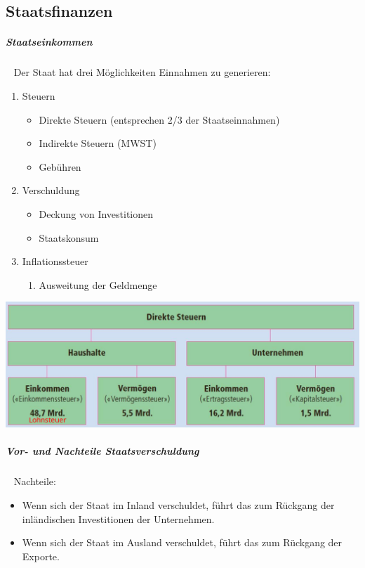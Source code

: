 \documentclass[11pt,twoside,landscape]{article}
\begin{document}
\begin{multicols}{3}
\section{Staatsfinanzen}
\label{sec:orgf94bfc7}
\subparagraph{Staatseinkommen} \
\label{sec:org14363e6}
Der Staat hat drei Möglichkeiten Einnahmen zu generieren:
\begin{enumerate}
\item Steuern
\begin{itemize}
\item Direkte Steuern (entsprechen 2/3 der Staatseinnahmen)
\item Indirekte Steuern (MWST)
\item Gebühren
\end{itemize}
\item Verschuldung
\begin{itemize}
\item Deckung von Investitionen
\item Staatskonsum
\end{itemize}
\item Inflationssteuer
\begin{enumerate}
\item Ausweitung der Geldmenge
\end{enumerate}
\end{enumerate}


{
\begin{center}
\includegraphics[width=.9\linewidth]{img/staatseinnahmen_schweiz.png}
\end{center}
\label{fig:aufteilung-der-steuern}
}

\subparagraph{Vor- und Nachteile Staatsverschuldung} \
\label{sec:org671161e}
Nachteile:
\begin{itemize}
\item Wenn sich der Staat im Inland verschuldet, führt das zum Rückgang der inländischen Investitionen der Unternehmen.
\item Wenn sich der Staat im Ausland verschuldet, führt das zum Rückgang der Exporte.
\end{itemize}


\end{multicols}
\end{document}
